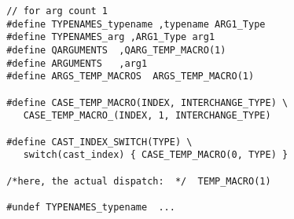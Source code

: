 \begin{lstlisting}
 // for arg count 1
 #define TYPENAMES_typename ,typename ARG1_Type
 #define TYPENAMES_arg ,ARG1_Type arg1
 #define QARGUMENTS  ,QARG_TEMP_MACRO(1) 
 #define ARGUMENTS   ,arg1
 #define ARGS_TEMP_MACROS  ARGS_TEMP_MACRO(1) 
 
 #define CASE_TEMP_MACRO(INDEX, INTERCHANGE_TYPE) \
    CASE_TEMP_MACRO_(INDEX, 1, INTERCHANGE_TYPE)
	
 #define CAST_INDEX_SWITCH(TYPE) \
    switch(cast_index) { CASE_TEMP_MACRO(0, TYPE) } 

 /*here, the actual dispatch:  */  TEMP_MACRO(1)
 
 #undef TYPENAMES_typename  ...
\end{lstlisting}

